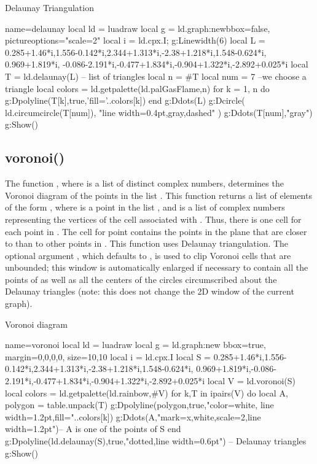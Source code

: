 \begin{demo}{Delaunay Triangulation}
\begin{luadraw}{name=delaunay}
local ld = luadraw
local g = ld.graph:new{bbox=false, pictureoptions="scale=2"}
local i = ld.cpx.I; g:Linewidth(6)
local L = {0.285+1.46*i,1.556-0.142*i,2.344+1.313*i,-2.38+1.218*i,1.548-0.624*i,
0.969+1.819*i, -0.086-2.191*i,-0.477+1.834*i,-0.904+1.322*i,-2.892+0.025*i}
local T = ld.delaunay(L) -- list of triangles
local n = #T
local num = 7 --we choose a triangle
local colors = ld.getpalette(ld.palGasFlame,n)
for k = 1, n do
    g:Dpolyline(T[k],true,'fill='..colors[k])
    end
g:Ddots(L)
g:Dcircle( {ld.circumcircle(T[num])}, "line width=0.4pt,gray,dashed" )
g:Ddots(T[num],"gray")
g:Show()
\end{luadraw}
\end{demo}

\subsection{voronoi()}

The function , where  is a list of distinct complex numbers, determines the Voronoi diagram of the points in the list . This function returns a list of elements of the form , where  is a point in the list , and  is a list of complex numbers representing the vertices of the cell associated with . Thus, there is one cell for each point in . The cell for point  contains the points in the plane that are closer to  than to other points in . This function uses Delaunay triangulation. The optional argument , which defaults to , is used to clip Voronoi cells that are unbounded; this window is automatically enlarged if necessary to contain all the points of  as well as all the centers of the circles circumscribed about the Delaunay triangles (note: this does not change the 2D window of the current graph).

\begin{demo}{Voronoi diagram}
\begin{luadraw}{name=voronoi}
local ld = luadraw
local g = ld.graph:new{ bbox=true, margin={0,0,0,0}, size={10,10}}
local i = ld.cpx.I
local S = {0.285+1.46*i,1.556-0.142*i,2.344+1.313*i,-2.38+1.218*i,1.548-0.624*i,
0.969+1.819*i,-0.086-2.191*i,-0.477+1.834*i,-0.904+1.322*i,-2.892+0.025*i}
local V = ld.voronoi(S)
local colors = ld.getpalette(ld.rainbow,#V)
for k,T in ipairs(V) do
    local A, polygon = table.unpack(T)
    g:Dpolyline(polygon,true,"color=white, line width=1.2pt,fill="..colors[k])
    g:Ddots(A,"mark=x,white,scale=2,line width=1.2pt")-- A is one of the points of S
end
g:Dpolyline(ld.delaunay(S),true,"dotted,line width=0.6pt") -- Delaunay triangles
g:Show()
\end{luadraw}
\end{demo}


